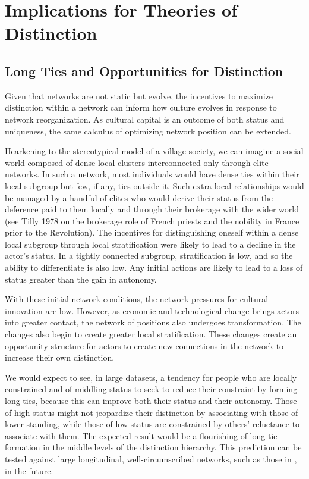 \documentclass[12pt]{article}
\begin{document}
\section{Implications for Theories of Distinction}
\subsection{Long Ties and Opportunities for Distinction}
Given that networks are not static but evolve, the incentives to maximize distinction within a network can inform how culture evolves in response to network reorganization. As cultural capital is an outcome of both status and uniqueness, the same calculus of optimizing network position can be extended.

Hearkening to the stereotypical model of a village society, we can imagine a social world composed of dense local clusters interconnected only through elite networks. In such a network, most individuals would have dense ties within their local subgroup but few, if any, ties outside it. Such extra-local relationships would be managed by a handful of elites who would derive their status from the deference paid to them locally and through their brokerage with the wider world (see Tilly 1978 on the brokerage role of French priests and the nobility in France prior to the Revolution). The incentives for distinguishing oneself within a dense local subgroup through local stratification were likely to lead to a decline in the actor's status. In a tightly connected subgroup, stratification is low, and so the ability to differentiate is also low. Any initial actions are likely to lead to a loss of status greater than the gain in autonomy. 

With these initial network conditions, the network pressures for cultural innovation are low. However, as economic and technological change brings actors into greater contact, the network of positions also undergoes transformation. The changes also begin to create greater local stratification. These changes create an opportunity structure for actors to create new connections in the network to increase their own distinction. 

We would expect to see, in large datasets, a tendency for people who are locally constrained and of middling status to seek to reduce their constraint by forming long ties, because this can improve both their status and their autonomy. Those of high status might not jeopardize their distinction by associating with those of lower standing, while those of low status are constrained by others' reluctance to associate with them. The expected result would be a flourishing of long-tie formation in the middle levels of the distinction hierarchy. This prediction can be tested against large longitudinal, well-circumscribed networks, such as those in \citep{bearman2004chains}, in the future. 
\end{document}
